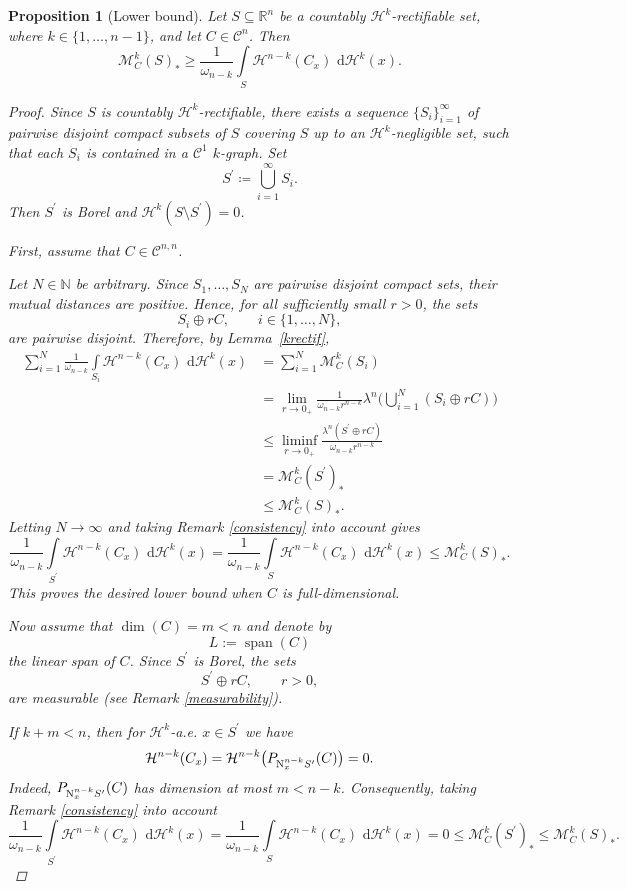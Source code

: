 \documentclass[pdflatex,sn-mathphys-num]{sn-jnl}
\theoremstyle{plain}
\newtheorem{proposition}[theorem]{Proposition}
\theoremstyle{definition}
\newcommand{\dH}[1]{\,\mathrm d\mathcal{H}^{#1}}
\begin{document}
\begin{proposition}[Lower bound]\label{LB}
Let $S\subseteq\mathbb{R}^n$ be a countably $\mathcal{H}^k$-rectifiable set,
where $k\in\{1,\dots,n-1\}$, and let $C\in\mathcal{C}^n$. Then
\[
\mathcal{M}^k_{C}(S)_*
\geq
\frac{1}{\omega_{n-k}}
\int\limits_{S}\mathcal{H}^{n-k}(C_x)\,\dH{k}(x).
\]
\begin{proof}
Since $S$ is countably
$\mathcal H^k$-rectifiable, there exists a sequence
$\{S_i\}_{i=1}^{\infty}$ of pairwise disjoint compact subsets of $S$
covering $S$ up to an $\mathcal H^k$-negligible set, such that each $S_i$
is contained in a $\mathcal C^1$ $k$-graph. Set $$S^{\prime}\coloneqq\bigcup_{i=1}^{\infty}S_i.$$ Then $S^{\prime}$ is Borel and $\mathcal{H}^k(S\setminus S^{\prime})=0$.

First, assume that $C\in\mathcal{C}^{n, n}$. 

Let $N\in\mathbb N$ be arbitrary. Since $S_1,\dots,S_N$ are pairwise
disjoint compact sets, their mutual distances are positive. Hence, for all
sufficiently small $r>0$, the sets
\[
S_i\oplus rC,\qquad i\in\{1, \dots, N\},
\]
are pairwise disjoint. Therefore, by Lemma~\ref{krectif},
\[
\begin{split}
\sum_{i=1}^{N}
\frac{1}{\omega_{n-k}}
\int\limits_{S_i}\mathcal H^{n-k}(C_x)\,\dH{k}(x)
&=
\sum_{i=1}^{N}\mathcal M_C^k(S_i)
\\
&=
\lim_{r\to0_+}
\frac{1}{\omega_{n-k}r^{n-k}}
\lambda^n\Big(\bigcup_{i=1}^{N}(S_i\oplus rC)\Big)
\\
&\leq
\liminf_{r\to0_+}
\frac{\lambda^n(S^{\prime}\oplus rC)}{\omega_{n-k}r^{n-k}}
\\
&=
\mathcal M_C^k(S^{\prime})_*\\
&\leq
\mathcal M_C^k(S)_*.
\end{split}
\]
Letting $N\to\infty$ and taking Remark \ref{consistency} into account gives
\[
\frac{1}{\omega_{n-k}}
\int\limits_{S^{\prime}}\mathcal H^{n-k}(C_x)\,\dH{k}(x)=\frac{1}{\omega_{n-k}}
\int\limits_{S}\mathcal H^{n-k}(C_x)\,\dH{k}(x)
\leq
\mathcal M_C^k(S)_*.
\]
This proves the desired lower bound when $C$ is full-dimensional.

Now assume that $\dim(C)=m<n$ and denote by
\[
L:=\operatorname{span}(C)
\]
the linear span of $C$. Since $S^{\prime}$ is Borel, the sets $$S^{\prime}\oplus rC, \qquad r>0,$$ are measurable (see Remark \ref{measurability}).

If $k+m<n$, then for $\mathcal H^k$-a.e. $x\in S^{\prime}$ we have
\[
\mathcal H^{n-k}(C_x)
=
\mathcal H^{n-k}\big(P_{\textup N_x^{n-k}S^{\prime}}(C)\big)=0.
\]
Indeed, $P_{\textup N_x^{n-k}S^{\prime}}(C)$ has dimension at most $m<n-k$.
Consequently, taking Remark \ref{consistency} into account
\[
\frac{1}{\omega_{n-k}}
\int\limits_{S^{\prime}}\mathcal H^{n-k}(C_x)\,\dH{k}(x)=\frac{1}{\omega_{n-k}}
\int\limits_{S}\mathcal H^{n-k}(C_x)\,\dH{k}(x)=0
\leq
\mathcal M_C^k(S^{\prime})_*\leq\mathcal M_C^k(S)_*.
\]


\end{proof}
\end{proposition}
\end{document}
